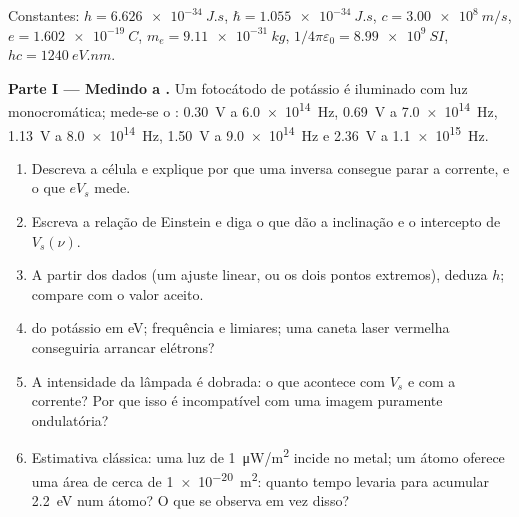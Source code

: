 \begin{problem}
\label{pb:b1:quantum-introduction:1}
Constantes: $h = \qty{6.626e-34}{J.s}$, $\hbar = \qty{1.055e-34}{J.s}$, $c =
\qty{3.00e8}{m/s}$, $e = \qty{1.602e-19}{C}$, $m_e = \qty{9.11e-31}{kg}$,
$1/4\pi\varepsilon_0 = \qty{8.99e9}{SI}$, $hc = \qty{1240}{eV.nm}$.

\medskip
\noindent\textbf{Parte I --- Medindo a .}
Um fotocátodo de potássio é iluminado com luz monocromática; mede-se o
: \qty{0.30}{V} a \qty{6.0e14}{Hz}, \qty{0.69}{V} a
\qty{7.0e14}{Hz}, \qty{1.13}{V} a \qty{8.0e14}{Hz}, \qty{1.50}{V} a
\qty{9.0e14}{Hz} e \qty{2.36}{V} a \qty{1.1e15}{Hz}.
\begin{enumerate}
  \item Descreva a célula e explique por que uma  inversa consegue parar
        a corrente, e o que $eV_s$ mede.
  \item Escreva a relação de Einstein e diga o que dão a inclinação e o
        intercepto de $V_s(\nu)$.
  \item A partir dos dados (um ajuste linear, ou os dois pontos extremos),
        deduza $h$; compare com o valor aceito.
  \item {} do potássio em eV; frequência e 
        limiares; uma caneta laser vermelha conseguiria arrancar elétrons?
  \item A intensidade da lâmpada é dobrada: o que acontece com $V_s$ e com a
        corrente? Por que isso é incompatível com uma imagem puramente ondulatória?
  \item Estimativa clássica: uma luz de \qty{1}{\micro W/m^2} incide no
        metal; um átomo oferece uma área de cerca de \qty{1e-20}{m^2}: quanto tempo
        levaria para acumular \qty{2.2}{eV} num átomo? O que se observa
        em vez disso?
\end{enumerate}


\end{problem}
